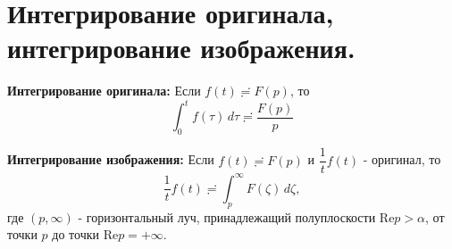 \section{Интегрирование оригинала, интегрирование
изображения.}\label{ux438ux43dux442ux435ux433ux440ux438ux440ux43eux432ux430ux43dux438ux435-ux43eux440ux438ux433ux438ux43dux430ux43bux430-ux438ux43dux442ux435ux433ux440ux438ux440ux43eux432ux430ux43dux438ux435-ux438ux437ux43eux431ux440ux430ux436ux435ux43dux438ux44f.}

\textbf{Интегрирование оригинала:} Если \(f(t)\risingdotseq F(p)\), то
\[
\int_{0}^{t}f(\tau)\,d\tau\risingdotseq \frac{F(p)}{p}
\]

\textbf{Интегрирование изображения:} Если \(f(t)\risingdotseq F(p)\) и
\(\dfrac{1}{t}f(t)\) - оригинал, то \[
\frac{1}{t}f(t)\risingdotseq\int_{p}^{\infty}F(\zeta)\,d\zeta,
\] где \((p,\infty)\) - горизонтальный луч, принадлежащий полуплоскости
\(\mathrm{Re} p>\alpha\), от точки \(p\) до точки
\(\mathrm{Re}p=+\infty\).
